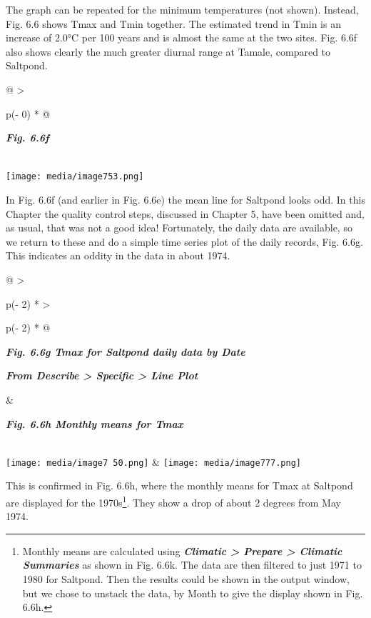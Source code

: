 \documentclass[
  letterpaper,
  DIV=11,
  numbers=noendperiod]{scrreprt}
\begin{document}
The graph can be repeated for the minimum temperatures (not shown).
Instead, Fig. 6.6 shows Tmax and Tmin together. The estimated trend in
Tmin is an increase of 2.0°C per 100 years and is almost the same at the
two sites. Fig. 6.6f also shows clearly the much greater diurnal range
at Tamale, compared to Saltpond.

\begin{longtable}[]{@{}
  >{\raggedright\arraybackslash}p{(\columnwidth - 0\tabcolsep) * }@{}}
\toprule\noalign{}
\begin{minipage}[b]{\linewidth}\raggedright
\textbf{\emph{Fig. 6.6f}}
\end{minipage} \\
\midrule\noalign{}
\endhead
\bottomrule\noalign{}
\endlastfoot
\texttt{[image: media/image753.png]} \\
\end{longtable}

In Fig. 6.6f (and earlier in Fig. 6.6e) the mean line for Saltpond looks
odd. In this Chapter the quality control steps, discussed in Chapter 5,
have been omitted and, as usual, that was not a good idea! Fortunately,
the daily data are available, so we return to these and do a simple time
series plot of the daily records, Fig. 6.6g. This indicates an oddity in
the data in about 1974.

\begin{longtable}[]{@{}
  >{\raggedright\arraybackslash}p{(\columnwidth - 2\tabcolsep) * }
  >{\raggedright\arraybackslash}p{(\columnwidth - 2\tabcolsep) * }@{}}
\toprule\noalign{}
\begin{minipage}[b]{\linewidth}\raggedright
\textbf{\emph{Fig. 6.6g Tmax for Saltpond daily data by Date}}

\textbf{\emph{From Describe \textgreater{} Specific \textgreater{} Line
Plot}}
\end{minipage} & \begin{minipage}[b]{\linewidth}\raggedright
\textbf{\emph{Fig. 6.6h Monthly means for Tmax}}
\end{minipage} \\
\midrule\noalign{}
\endhead
\bottomrule\noalign{}
\endlastfoot
\texttt{[image: media/image7 50.png]}
& \texttt{[image: media/image777.png]} \\
\end{longtable}

This is confirmed in Fig. 6.6h, where the monthly means for Tmax at
Saltpond are displayed for the 1970s\footnote{Monthly means are
  calculated using \textbf{\emph{Climatic \textgreater{} Prepare
  \textgreater{} Climatic Summaries}} as shown in Fig. 6.6k. The data
  are then filtered to just 1971 to 1980 for Saltpond. Then the results
  could be shown in the output window, but we chose to unstack the data,
  by Month to give the display shown in Fig. 6.6h.}. They show a drop of
about 2 degrees from May 1974.
\end{document}
